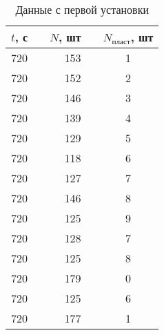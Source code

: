 \begin{table}
\centering
\caption{Данные с первой установки}
\label{tab:data1}
\begin{tabular}{rcrcc}
\toprule
 $t$, с & \hspace*{10pt} &  $N$, шт & \hspace*{10pt} &  $N_{\text{пласт}}$, шт \\
\midrule
  720 & & 153 & & 1 \\
  720 & & 152 & & 2 \\
  720 & & 146 & & 3 \\
  720 & & 139 & & 4 \\
  720 & & 129 & & 5 \\
  720 & & 118 & & 6 \\
  720 & & 127 & & 7 \\
  720 & & 146 & & 8 \\
  720 & & 125 & & 9 \\
  720 & & 128 & & 7 \\
  720 & & 125 & & 8 \\
  720 & & 179 & & 0 \\
  720 & & 125 & & 6 \\
  720 & & 177 & & 1 \\
\bottomrule
\end{tabular}
\end{table}
